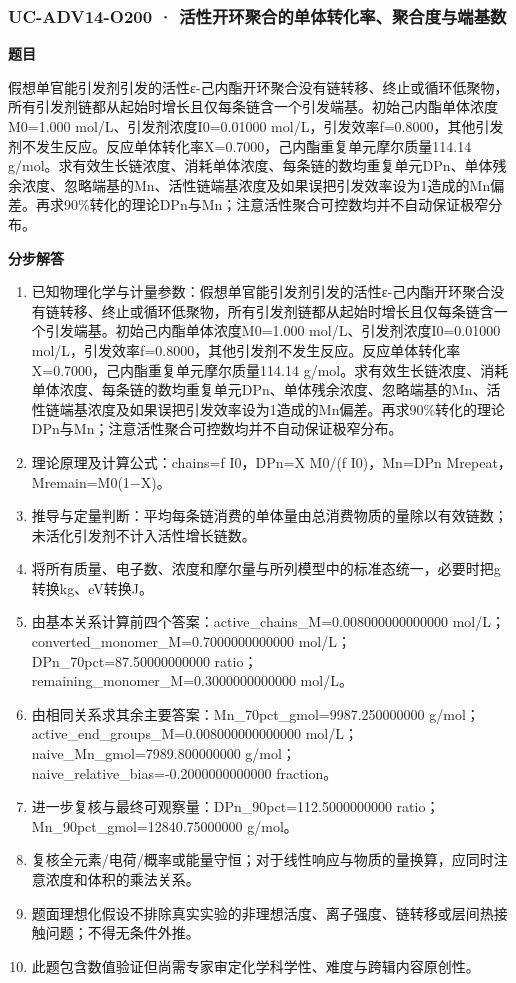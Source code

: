\documentclass[UTF8,11pt,a4paper]{ctexart}
\begin{document}
\subsubsection*{UC-ADV14-O200 · 活性开环聚合的单体转化率、聚合度与端基数}
\noindent\textbf{题目}\par
假想单官能引发剂引发的活性ε-己内酯开环聚合没有链转移、终止或循环低聚物，所有引发剂链都从起始时增长且仅每条链含一个引发端基。初始己内酯单体浓度M0=1.000 mol/L、引发剂浓度I0=0.01000 mol/L，引发效率f=0.8000，其他引发剂不发生反应。反应单体转化率X=0.7000，己内酯重复单元摩尔质量114.14 g/mol。求有效生长链浓度、消耗单体浓度、每条链的数均重复单元DPn、单体残余浓度、忽略端基的Mn、活性链端基浓度及如果误把引发效率设为1造成的Mn偏差。再求90\%转化的理论DPn与Mn；注意活性聚合可控数均并不自动保证极窄分布。\par
\medskip\noindent\textbf{分步解答}
\begin{enumerate}
\item 已知物理化学与计量参数：假想单官能引发剂引发的活性ε-己内酯开环聚合没有链转移、终止或循环低聚物，所有引发剂链都从起始时增长且仅每条链含一个引发端基。初始己内酯单体浓度M0=1.000 mol/L、引发剂浓度I0=0.01000 mol/L，引发效率f=0.8000，其他引发剂不发生反应。反应单体转化率X=0.7000，己内酯重复单元摩尔质量114.14 g/mol。求有效生长链浓度、消耗单体浓度、每条链的数均重复单元DPn、单体残余浓度、忽略端基的Mn、活性链端基浓度及如果误把引发效率设为1造成的Mn偏差。再求90\%转化的理论DPn与Mn；注意活性聚合可控数均并不自动保证极窄分布。
\item 理论原理及计算公式：chains=f I0，DPn=X M0/(f I0)，Mn=DPn Mrepeat，Mremain=M0(1−X)。
\item 推导与定量判断：平均每条链消费的单体量由总消费物质的量除以有效链数；未活化引发剂不计入活性增长链数。
\item 将所有质量、电子数、浓度和摩尔量与所列模型中的标准态统一，必要时把g转换kg、eV转换J。
\item 由基本关系计算前四个答案：active\_chains\_M=0.008000000000000 mol/L；converted\_monomer\_M=0.7000000000000 mol/L；DPn\_70pct=87.50000000000 ratio；remaining\_monomer\_M=0.3000000000000 mol/L。
\item 由相同关系求其余主要答案：Mn\_70pct\_gmol=9987.250000000 g/mol；active\_end\_groups\_M=0.008000000000000 mol/L；naive\_Mn\_gmol=7989.800000000 g/mol；naive\_relative\_bias=-0.2000000000000 fraction。
\item 进一步复核与最终可观察量：DPn\_90pct=112.5000000000 ratio；Mn\_90pct\_gmol=12840.75000000 g/mol。
\item 复核全元素/电荷/概率或能量守恒；对于线性响应与物质的量换算，应同时注意浓度和体积的乘法关系。
\item 题面理想化假设不排除真实实验的非理想活度、离子强度、链转移或层间热接触问题；不得无条件外推。
\item 此题包含数值验证但尚需专家审定化学科学性、难度与跨辑内容原创性。
\end{enumerate}
\end{document}
